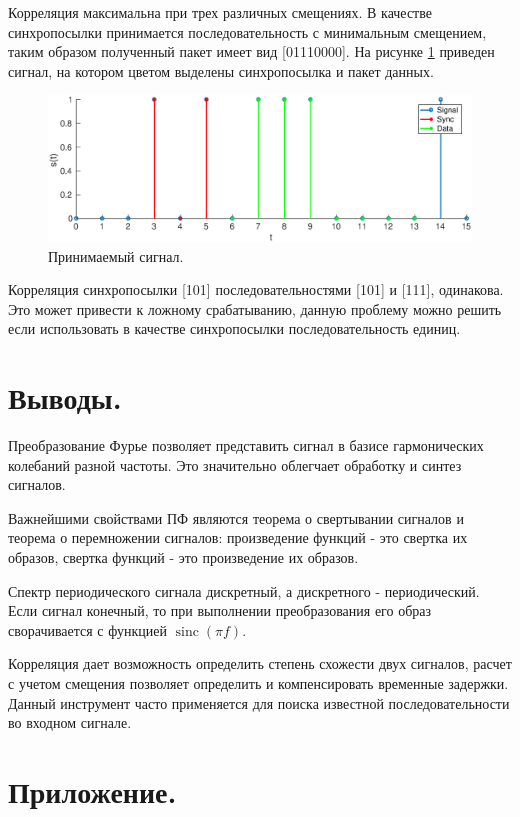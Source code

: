 \documentclass[a4paper,14pt]{extarticle}
\DeclareMathOperator{\sinc}{sinc}
\begin{document}
Корреляция максимальна при трех различных смещениях. В качестве синхропосылки принимается последовательность с минимальным смещением, таким образом полученный пакет имеет вид [01110000]. На рисунке \ref{corr_on_s} приведен сигнал, на котором цветом выделены синхропосылка и пакет данных.

\begin{figure}[H]
\includegraphics[width=1\textwidth]{corr_on_sig.eps}
\captionsetup{justification=centering,margin=1cm}
\caption{Принимаемый сигнал.}
\label{corr_on_s}
\end{figure}

Корреляция синхропосылки [101] последовательностями [101] и [111], одинакова. Это может привести к ложному срабатыванию, данную проблему можно решить если использовать в качестве синхропосылки последовательность единиц. 

\section{Выводы.}

Преобразование Фурье позволяет представить сигнал в базисе гармонических колебаний разной частоты. Это значительно облегчает обработку и синтез сигналов.

Важнейшими свойствами ПФ являются теорема о свертывании сигналов и теорема о перемножении сигналов: произведение функций - это свертка их образов, свертка функций - это произведение их образов.

Спектр периодического сигнала дискретный, а дискретного - периодический. Если сигнал конечный, то при выполнении преобразования его образ сворачивается с функцией $\sinc(\pi f)$. 

Корреляция дает возможность определить степень схожести двух сигналов, расчет с учетом смещения позволяет определить и компенсировать временные задержки. Данный инструмент часто применяется для поиска известной последовательности во входном сигнале.

\section{Приложение.}






\end{document}
